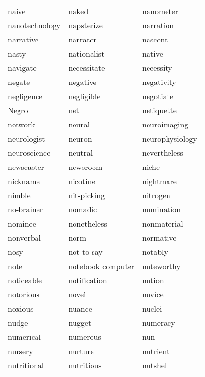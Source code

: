 \documentclass{minimal}
\begin{document}
\begin{longtable}{p{2.7cm}@{\hskip 0.2cm}p{2.7cm}@{\hskip 0.2cm}p{2.7cm}}
naive & naked & nanometer \\
nanotechnology & napsterize & narration \\
narrative & narrator & nascent \\
nasty & nationalist & native \\
navigate & necessitate & necessity \\
negate & negative & negativity \\
negligence & negligible & negotiate \\
Negro & net & netiquette \\
network & neural & neuroimaging \\
neurologist & neuron & neurophysiology \\
neuroscience & neutral & nevertheless \\
newscaster & newsroom & niche \\
nickname & nicotine & nightmare \\
nimble & nit-picking & nitrogen \\
no-brainer & nomadic & nomination \\
nominee & nonetheless & nonmaterial \\
nonverbal & norm & normative \\
nosy & not to say & notably \\
note & notebook computer & noteworthy \\
noticeable & notification & notion \\
notorious & novel & novice \\
noxious & nuance & nuclei \\
nudge & nugget & numeracy \\
numerical & numerous & nun \\
nursery & nurture & nutrient \\
nutritional & nutritious & nutshell
\end{longtable}
\end{document}
